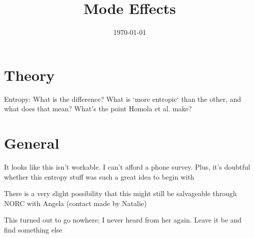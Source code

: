

\title{Mode Effects}

\date{\today}



\maketitle




\section*{Theory}
	\begin{coi}
		\item Entropy: What is the difference? What is `more entropic` than the other, and what does that mean? What's the point Homola et al. make?
	\end{coi}


\section*{General}
	\begin{coi}
		\item It looks like this isn't workable. I can't afford a phone survey. Plus, it's doubtful whether this entropy stuff was such a great idea to begin with
		\item There is a very slight possibility that this might still be salvageable through NORC with Angela (contact made by Natalie)
		\item This turned out to go nowhere; I never heard from her again. Leave it be and find something else
	\end{coi}



